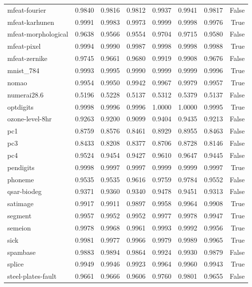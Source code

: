 \begin{table}[htbp]
\begin{tabular}{lrrrrrrr}
mfeat-fourier & 0.9840 & 0.9816 & 0.9812 & 0.9937 & 0.9941 & 0.9817 & False \\
mfeat-karhunen & 0.9991 & 0.9983 & 0.9973 & 0.9999 & 0.9998 & 0.9976 & True \\
mfeat-morphological & 0.9638 & 0.9566 & 0.9554 & 0.9704 & 0.9715 & 0.9580 & False \\
mfeat-pixel & 0.9994 & 0.9990 & 0.9987 & 0.9998 & 0.9998 & 0.9988 & True \\
mfeat-zernike & 0.9745 & 0.9661 & 0.9680 & 0.9919 & 0.9908 & 0.9676 & False \\
mnist\_784 & 0.9993 & 0.9995 & 0.9990 & 0.9999 & 0.9999 & 0.9996 & True \\
nomao & 0.9954 & 0.9950 & 0.9942 & 0.9967 & 0.9979 & 0.9957 & True \\
numerai28.6 & 0.5196 & 0.5228 & 0.5137 & 0.5312 & 0.5379 & 0.5137 & False \\
optdigits & 0.9998 & 0.9996 & 0.9996 & 1.0000 & 1.0000 & 0.9995 & True \\
ozone-level-8hr & 0.9263 & 0.9200 & 0.9099 & 0.9404 & 0.9435 & 0.9213 & False \\
pc1 & 0.8759 & 0.8576 & 0.8461 & 0.8929 & 0.8955 & 0.8463 & False \\
pc3 & 0.8433 & 0.8208 & 0.8377 & 0.8706 & 0.8728 & 0.8146 & False \\
pc4 & 0.9524 & 0.9454 & 0.9427 & 0.9610 & 0.9647 & 0.9445 & False \\
pendigits & 0.9998 & 0.9997 & 0.9997 & 0.9999 & 0.9999 & 0.9997 & True \\
phoneme & 0.9535 & 0.9535 & 0.9616 & 0.9759 & 0.9784 & 0.9552 & False \\
qsar-biodeg & 0.9371 & 0.9360 & 0.9340 & 0.9478 & 0.9451 & 0.9313 & False \\
satimage & 0.9917 & 0.9911 & 0.9897 & 0.9958 & 0.9964 & 0.9908 & True \\
segment & 0.9957 & 0.9952 & 0.9952 & 0.9977 & 0.9978 & 0.9947 & True \\
semeion & 0.9978 & 0.9968 & 0.9961 & 0.9993 & 0.9992 & 0.9956 & True \\
sick & 0.9981 & 0.9977 & 0.9966 & 0.9979 & 0.9989 & 0.9965 & True \\
spambase & 0.9883 & 0.9894 & 0.9864 & 0.9924 & 0.9930 & 0.9879 & False \\
splice & 0.9949 & 0.9946 & 0.9923 & 0.9964 & 0.9960 & 0.9943 & True \\
steel-plates-fault & 0.9661 & 0.9666 & 0.9606 & 0.9760 & 0.9801 & 0.9655 & False \\

\end{tabular}
\end{table}
